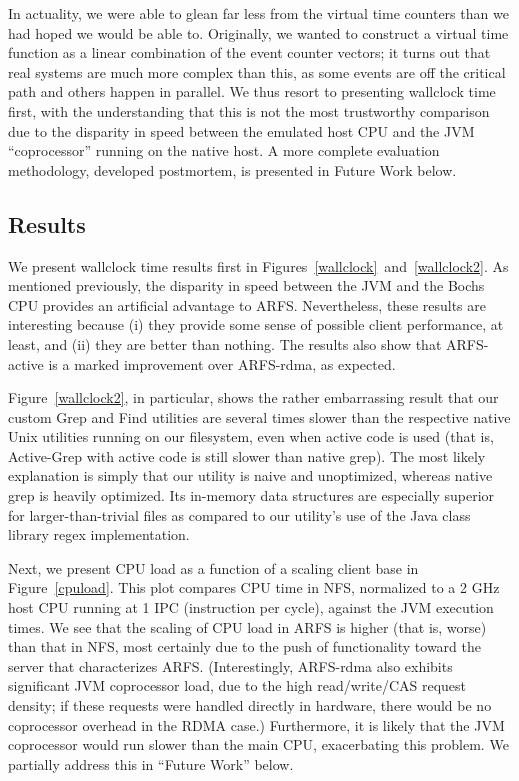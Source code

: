 \documentclass[10pt]{article}
\begin{document}
In actuality, we were able to glean far less from the virtual time
counters than we had hoped we would be able to. Originally, we wanted
to construct a virtual time function as a linear combination of the
event counter vectors; it turns out that real systems are much more
complex than this, as some events are off the critical path and others
happen in parallel. We thus resort to presenting wallclock time first,
with the understanding that this is not the most trustworthy
comparison due to the disparity in speed between the emulated host CPU
and the JVM ``coprocessor'' running on the native host. A more
complete evaluation methodology, developed postmortem, is presented in
Future Work below.

\subsection{Results}

We present wallclock time results first in
Figures~\ref{wallclock}~and~\ref{wallclock2}. As mentioned previously,
the disparity in speed between the JVM and the Bochs CPU provides an
artificial advantage to ARFS. Nevertheless, these results are
interesting because (i) they provide some sense of possible client
performance, at least, and (ii) they are better than nothing. The
results also show that ARFS-active is a marked improvement over
ARFS-rdma, as expected.

Figure~\ref{wallclock2}, in particular, shows the rather embarrassing
result that our custom Grep and Find utilities are several times
slower than the respective native Unix utilities running on our
filesystem, even when active code is used (that is, Active-Grep with
active code is still slower than native grep). The most likely
explanation is simply that our utility is naive and unoptimized,
whereas native grep is heavily optimized. Its in-memory data
structures are especially superior for larger-than-trivial files as
compared to our utility's use of the Java class library regex
implementation.

Next, we present CPU load as a function of a scaling client base in
Figure~\ref{cpuload}. This plot compares CPU time in NFS, normalized
to a 2 GHz host CPU running at 1 IPC (instruction per cycle), against
the JVM execution times. We see that the scaling of CPU load in ARFS
is higher (that is, worse) than that in NFS, most certainly due to the
push of functionality toward the server that characterizes
ARFS. (Interestingly, ARFS-rdma also exhibits significant JVM
coprocessor load, due to the high read/write/CAS request density; if
these requests were handled directly in hardware, there would be no
coprocessor overhead in the RDMA case.) Furthermore, it is likely that
the JVM coprocessor would run slower than the main CPU, exacerbating
this problem. We partially address this in ``Future Work'' below.
\end{document}
